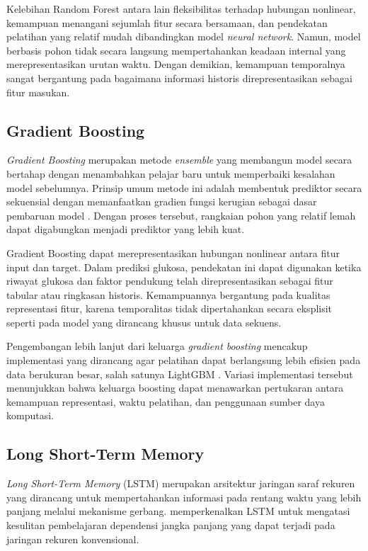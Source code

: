 Kelebihan Random Forest antara lain fleksibilitas terhadap hubungan nonlinear, kemampuan menangani sejumlah fitur secara bersamaan, dan pendekatan pelatihan yang relatif 
mudah dibandingkan model \textit{neural network}. Namun, model berbasis pohon tidak secara langsung mempertahankan keadaan internal yang merepresentasikan urutan waktu. Dengan demikian, 
kemampuan temporalnya sangat bergantung pada bagaimana informasi historis direpresentasikan sebagai fitur masukan.

\subsection{Gradient Boosting}
\label{subsec:bab2-gradient-boosting}

\textit{Gradient Boosting} merupakan metode \textit{ensemble} yang membangun model secara bertahap dengan menambahkan pelajar baru untuk memperbaiki kesalahan model sebelumnya. 
Prinsip umum metode ini adalah membentuk prediktor secara sekuensial dengan memanfaatkan gradien fungsi kerugian sebagai dasar pembaruan model \parencite{friedman2001}. 
Dengan proses tersebut, rangkaian pohon yang relatif lemah dapat digabungkan menjadi prediktor yang lebih kuat.

Gradient Boosting dapat merepresentasikan hubungan nonlinear antara fitur input dan target. Dalam prediksi glukosa, pendekatan ini dapat digunakan ketika riwayat glukosa dan 
faktor pendukung telah direpresentasikan sebagai fitur tabular atau ringkasan historis. Kemampuannya bergantung pada kualitas representasi fitur, karena temporalitas tidak 
dipertahankan secara eksplisit seperti pada model yang dirancang khusus untuk data sekuens.

Pengembangan lebih lanjut dari keluarga \textit{gradient boosting} mencakup implementasi yang dirancang agar pelatihan dapat berlangsung lebih efisien pada data berukuran besar, 
salah satunya LightGBM \parencite{ke2017}. Variasi implementasi tersebut menunjukkan bahwa keluarga boosting dapat menawarkan pertukaran antara kemampuan representasi, waktu 
pelatihan, dan penggunaan sumber daya komputasi.

\subsection{Long Short-Term Memory}
\label{subsec:bab2-lstm}

\textit{Long Short-Term Memory} (LSTM) merupakan arsitektur jaringan saraf rekuren yang dirancang untuk mempertahankan informasi pada rentang waktu yang lebih panjang melalui 
mekanisme gerbang. \textcite{hochreiter1997} memperkenalkan LSTM untuk mengatasi kesulitan pembelajaran dependensi jangka panjang yang dapat terjadi pada jaringan rekuren
konvensional.


